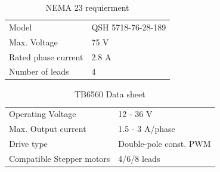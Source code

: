 \documentclass[11pt,a4paper]{article}
\begin{document}
\begin{table}[h!]
\centering
\begin{tabular}{ ||l | l ||}
	\hline
	Model & QSH 5718-76-28-189\\
	Max. Voltage & 75 V\\
	Rated phase current & 2.8 A\\
	Number of leads & 4\\
	\hline
\end{tabular}
\caption{NEMA 23 requierment} 
\end{table}
\begin{table}[h!]
\centering
\begin{tabular}{|| l | l ||}
	\hline
	Operating Voltage & 12 - 36 V\\
	Max. Output current & 1.5 - 3 A/phase\\
	Drive type & Double-pole const. PWM\\
	Compatible Stepper motors & 4/6/8 leads\\
	\hline
\end{tabular}
\caption{TB6560 Data sheet} 
\end{table}
\end{document}
